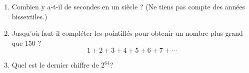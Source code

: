\documentclass[11pt,class=report,crop=false]{standalone}
\begin{document}

\begin{activite}


\begin{enumerate}
  \item Combien y a-t-il de secondes en un siècle ? (Ne tiens pas compte des années bissextiles.)
  
 \item Jusqu'où faut-il compléter les pointillés pour obtenir un nombre plus grand que 150 ?
  $$1+2+3+4+5+6+7+\cdots$$
  
  \item Quel est le dernier chiffre de $2^{64}$? 
  
  
  
  
    
\end{enumerate}

\end{activite}

\end{document}
